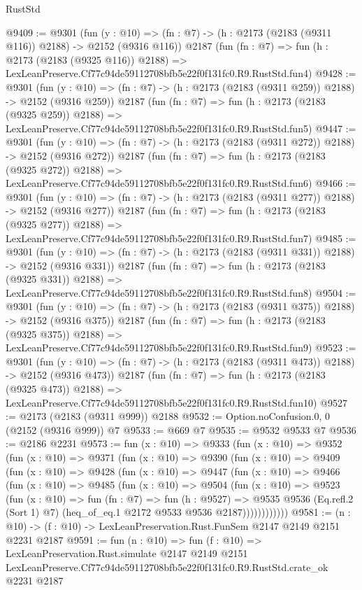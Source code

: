 \begin{lexlean}{RustStd}
\begin{coremodule}
@9409 := @9301
    (fun (y : @10) => (fn : @7) -> (h : @2173 (@2183 (@9311 @116)) @2188) -> @2152 (@9316 @116))
    @2187
    (fun (fn : @7) =>
    fun (h : @2173 (@2183 (@9325 @116)) @2188) =>
    LexLeanPreserve.Cf77c94de59112708bfb5e22f0f131fc0.R9.RustStd.fun4)
@9428 := @9301
    (fun (y : @10) => (fn : @7) -> (h : @2173 (@2183 (@9311 @259)) @2188) -> @2152 (@9316 @259))
    @2187
    (fun (fn : @7) =>
    fun (h : @2173 (@2183 (@9325 @259)) @2188) =>
    LexLeanPreserve.Cf77c94de59112708bfb5e22f0f131fc0.R9.RustStd.fun5)
@9447 := @9301
    (fun (y : @10) => (fn : @7) -> (h : @2173 (@2183 (@9311 @272)) @2188) -> @2152 (@9316 @272))
    @2187
    (fun (fn : @7) =>
    fun (h : @2173 (@2183 (@9325 @272)) @2188) =>
    LexLeanPreserve.Cf77c94de59112708bfb5e22f0f131fc0.R9.RustStd.fun6)
@9466 := @9301
    (fun (y : @10) => (fn : @7) -> (h : @2173 (@2183 (@9311 @277)) @2188) -> @2152 (@9316 @277))
    @2187
    (fun (fn : @7) =>
    fun (h : @2173 (@2183 (@9325 @277)) @2188) =>
    LexLeanPreserve.Cf77c94de59112708bfb5e22f0f131fc0.R9.RustStd.fun7)
@9485 := @9301
    (fun (y : @10) => (fn : @7) -> (h : @2173 (@2183 (@9311 @331)) @2188) -> @2152 (@9316 @331))
    @2187
    (fun (fn : @7) =>
    fun (h : @2173 (@2183 (@9325 @331)) @2188) =>
    LexLeanPreserve.Cf77c94de59112708bfb5e22f0f131fc0.R9.RustStd.fun8)
@9504 := @9301
    (fun (y : @10) => (fn : @7) -> (h : @2173 (@2183 (@9311 @375)) @2188) -> @2152 (@9316 @375))
    @2187
    (fun (fn : @7) =>
    fun (h : @2173 (@2183 (@9325 @375)) @2188) =>
    LexLeanPreserve.Cf77c94de59112708bfb5e22f0f131fc0.R9.RustStd.fun9)
@9523 := @9301
    (fun (y : @10) => (fn : @7) -> (h : @2173 (@2183 (@9311 @473)) @2188) -> @2152 (@9316 @473))
    @2187
    (fun (fn : @7) =>
    fun (h : @2173 (@2183 (@9325 @473)) @2188) =>
    LexLeanPreserve.Cf77c94de59112708bfb5e22f0f131fc0.R9.RustStd.fun10)
@9527 := @2173 (@2183 (@9311 @999)) @2188
@9532 := Option.noConfusion.{0, 0} (@2152 (@9316 @999)) @7
@9533 := @669 @7
@9535 := @9532 @9533 @7
@9536 := @2186 @2231
@9573 := fun (x : @10) =>
  @9333
    (fun (x : @10) =>
    @9352
      (fun (x : @10) =>
      @9371
        (fun (x : @10) =>
        @9390
          (fun (x : @10) =>
          @9409
            (fun (x : @10) =>
            @9428
              (fun (x : @10) =>
              @9447
                (fun (x : @10) =>
                @9466
                  (fun (x : @10) =>
                  @9485
                    (fun (x : @10) =>
                    @9504
                      (fun (x : @10) =>
                      @9523
                        (fun (x : @10) =>
                        fun (fn : @7) =>
                        fun (h : @9527) =>
                        @9535
                          @9536
                          (Eq.refl.{2} (Sort 1) @7)
                          (heq_of_eq.{1} @2172 @9533 @9536 @2187))))))))))))
@9581 := (n : @10) -> (f : @10) -> LexLeanPreservation.Rust.FunSem @2147 @2149 @2151 @2231 @2187
@9591 := fun (n : @10) =>
  fun (f : @10) =>
  LexLeanPreservation.Rust.simulate
    @2147
    @2149
    @2151
    LexLeanPreserve.Cf77c94de59112708bfb5e22f0f131fc0.R9.RustStd.crate_ok
    @2231
    @2187
\end{coremodule}
\end{lexlean}
